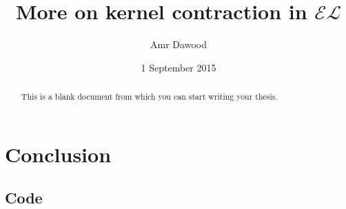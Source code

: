 \documentclass{sfuthesis}
\title{More on kernel contraction in $\mathcal{EL}$}
\author{Amr Dawood}
\date{1 September 2015}
\theoremstyle{plain}
\theoremstyle{definition}
\begin{document}
\frontmatter
\maketitle{}
\makecommittee{}

\begin{abstract}
	This is a blank document from which you can start writing your thesis.
\end{abstract}


\begin{dedication} %
\end{dedication}


\begin{acknowledgements} %
\end{acknowledgements}

\tableofcontents\clearpage
{}\listoftables\clearpage
{}\listoffigures





%
%

\mainmatter%














\chapter{Conclusion}




%
%
%
%
%

\backmatter%
	
	

\begin{appendices} %
	\chapter{Code}
\end{appendices}
\end{document}
